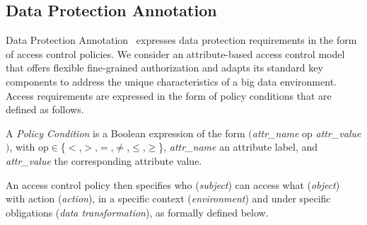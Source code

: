 \subsection{Data Protection Annotation \myLambda}\label{sec:nonfuncannotation}
Data Protection Annotation \myLambda\ expresses data protection requirements in the form of access control policies. We consider an attribute-based access control model that offers flexible fine-grained authorization and adapts its standard key components to address the unique characteristics of a big data environment. Access requirements are expressed in the form of policy conditions that are defined as follows.

\begin{definition}\label{def:policy_cond}
  A \emph{Policy Condition} is a Boolean expression of the form $($\emph{attr\_name} op \emph{attr\_value}$)$, with op$\in$\{$<$,$>$,$=$,$\neq$,$\leq$,$\geq$\}, \emph{attr\_name} an attribute label, and \emph{attr\_value} the corresponding attribute value.
\end{definition}

An access control policy then specifies who (\emph{subject}) can access what (\emph{object}) with action (\emph{action}), in a specific context (\emph{environment}) and under specific obligations (\emph{data transformation}), as formally defined below. 

